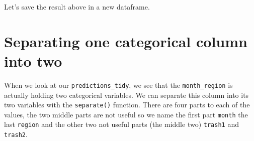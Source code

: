 \documentclass[
]{book}
\newenvironment{Shaded}{\begin{snugshade}}{\end{snugshade}}
\newcommand{\DataTypeTok}[1]{\textcolor[rgb]{0.13,0.29,0.53}{#1}}
\newcommand{\KeywordTok}[1]{\textcolor[rgb]{0.13,0.29,0.53}{\textbf{#1}}}
\newcommand{\NormalTok}[1]{#1}
\newcommand{\OperatorTok}[1]{\textcolor[rgb]{0.81,0.36,0.00}{\textbf{#1}}}
\newcommand{\StringTok}[1]{\textcolor[rgb]{0.31,0.60,0.02}{#1}}
\begin{document}
Let's save the result above in a new dataframe.

\begin{Shaded}
\end{Shaded}

\hypertarget{separating-one-categorical-column-into-two}{%
\section{Separating one categorical column into two}\label{separating-one-categorical-column-into-two}}

When we look at our \texttt{predictions\_tidy}, we see that the \texttt{month\_region} is actually holding two categorical variables. We can separate this column into its two variables with the \texttt{separate()} function. There are four parts to each of the values, the two middle parts are not useful so we name the first part \texttt{month} the last \texttt{region} and the other two not useful parts (the middle two) \texttt{trash1} and \texttt{trash2}.

\begin{Shaded}
\end{Shaded}
\end{document}

